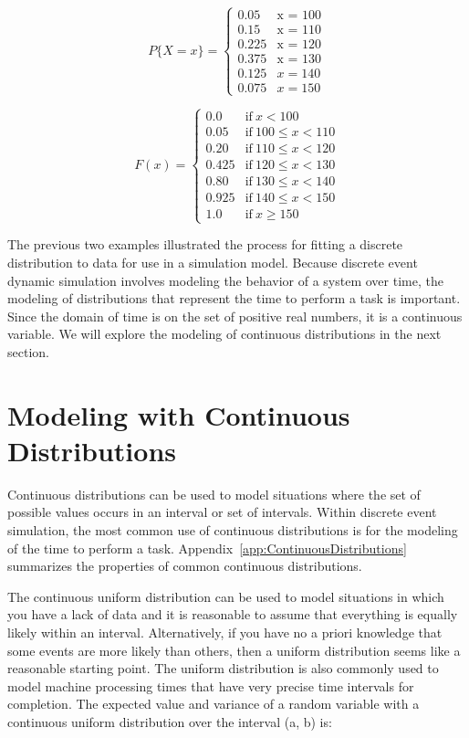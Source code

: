 \documentclass[
]{book}
\theoremstyle{definition}
\theoremstyle{definition}
\theoremstyle{definition}
\theoremstyle{definition}
\theoremstyle{remark}
\begin{document}
\[P\{X=x\} = 
\begin{cases}
    0.05 & \text{x = 100}\\
    0.15 & \text{x = 110}\\
    0.225 & \text{x = 120}\\
    0.375 & \text{x = 130}\\
    0.125 & x = 140\\
    0.075 & x = 150
\end{cases}\]

\[F(x) =
\begin{cases}
0.0 & \mathrm{if} \ x < 100\\
0.05 & \mathrm{if} \ 100 \le x < 110\\
0.20 & \mathrm{if} \ 110 \le x < 120\\
0.425 & \mathrm{if} \ 120 \le x < 130\\
0.80 & \mathrm{if} \ 130 \le x < 140\\
0.925 & \mathrm{if} \ 140 \le x < 150\\
1.0 & \mathrm{if} \ x \geq 150
\end{cases}
\]

The previous two examples illustrated the process for fitting a discrete distribution to data for use in a simulation model. Because discrete event dynamic simulation involves modeling the behavior of a system over time, the modeling of distributions that represent the time to perform a task is important. Since the domain of time is on the set of positive real numbers, it is a continuous variable. We will explore the modeling of continuous distributions in the next section.

\hypertarget{app:idm:sec:MCD}{%
\section{Modeling with Continuous Distributions}\label{app:idm:sec:MCD}}

Continuous distributions can be used to model situations where the
set of possible values occurs in an interval or set of intervals. Within
discrete event simulation, the most common use of continuous
distributions is for the modeling of the time to perform a task.
Appendix~\ref{app:ContinuousDistributions} summarizes the properties of common
continuous distributions.

The continuous uniform distribution can be used to model situations in
which you have a lack of data and it is reasonable to assume that
everything is equally likely within an interval. Alternatively, if you have no a priori knowledge that some events are more likely than others, then a uniform distribution seems like a reasonable starting point. The uniform distribution is also commonly used to model machine processing times
that have very precise time intervals for completion. The expected value
and variance of a random variable with a continuous uniform distribution
over the interval (a, b) is:
\end{document}
